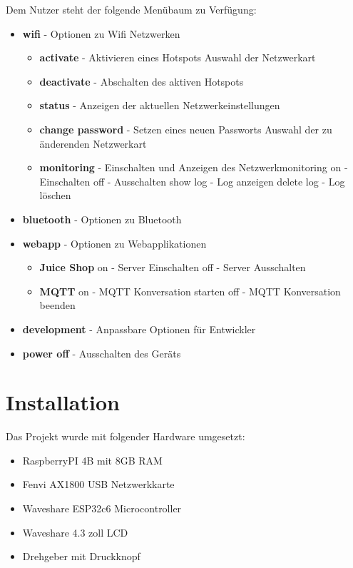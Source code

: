 \documentclass[a4paper,12pt]{article}
\begin{document}
Dem Nutzer steht der folgende Menübaum zu Verfügung:

\begin{itemize}
    \item \textbf{wifi} - Optionen zu Wifi Netzwerken
        \begin{itemize}
            \item \textbf{activate} - Aktivieren eines Hotspots
                \subitem Auswahl der Netzwerkart
            \item \textbf{deactivate} - Abschalten des aktiven Hotspots
            \item \textbf{status} - Anzeigen der aktuellen Netzwerkeinstellungen
            \item \textbf{change password} - Setzen eines neuen Passworts
                \subitem Auswahl der zu änderenden Netzwerkart
            \item \textbf{monitoring} - Einschalten und Anzeigen des Netzwerkmonitoring
                \subitem on - Einschalten
                \subitem off - Ausschalten
                \subitem show log - Log anzeigen
                \subitem delete log - Log löschen
        \end{itemize}
    \item \textbf{bluetooth} - Optionen zu Bluetooth
    \item \textbf{webapp} - Optionen zu Webapplikationen
        \begin{itemize}
            \item \textbf{Juice Shop}
                \subitem on - Server Einschalten
                \subitem off - Server Ausschalten
            \item \textbf{MQTT}
                \subitem on - MQTT Konversation starten
                \subitem off - MQTT Konversation beenden
        \end{itemize}
    \item \textbf{development} - Anpassbare Optionen für Entwickler
    \item \textbf{power off} - Ausschalten des Geräts
\end{itemize}


\section{Installation}
Das Projekt wurde mit folgender Hardware umgesetzt:
\begin{itemize}
    \item RaspberryPI 4B mit 8GB RAM
    \item Fenvi AX1800 USB Netzwerkkarte
    \item Waveshare ESP32c6 Microcontroller
    \item Waveshare 4.3 zoll LCD 
    \item Drehgeber mit Druckknopf
\end{itemize}
\end{document}
